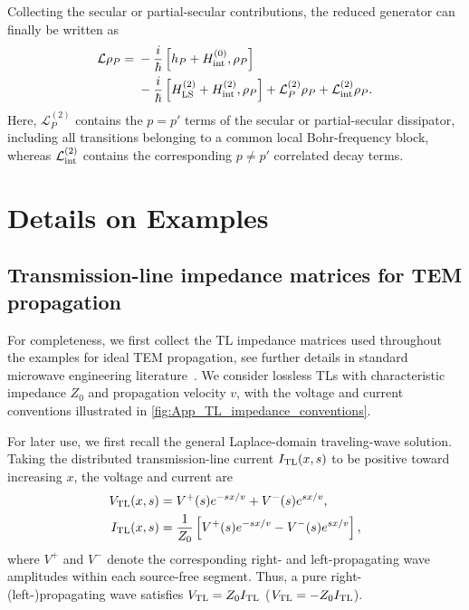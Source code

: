 \documentclass[prx,aps,twocolumn,article]{revtex4-2}
\begin{document}
Collecting the secular or partial-secular contributions, the reduced
generator can finally be written as
\begin{align}
\begin{aligned}
    \mathcal L\rho_P
    ={}&
    -\frac{i}{\hbar}
    \left[
        h_P
        +
        H_{\mathrm{int}}^{(0)},
        \rho_P
    \right]
    \\
    &-
    \frac{i}{\hbar}
    \left[
        H_{\rm LS}^{(2)}
        +
        H_{\rm int}^{(2)},
        \rho_P
    \right]
    +
    \mathcal L_P^{(2)}\rho_P
    +
    \mathcal L_{\rm int}^{(2)}\rho_P.
\end{aligned}
\label{Eq:EffectiveMEAppendix}
\end{align}
Here,
$\mathcal L_P^{(2)}$
contains the $p=p'$ terms of the secular or partial-secular dissipator,
including all transitions belonging to a common local Bohr-frequency
block, whereas
$\mathcal L_{\rm int}^{(2)}$
contains the corresponding $p\neq p'$ correlated decay terms.

\section{Details on Examples}
\label{AppSec:DetailsExamples}
\subsection{Transmission-line impedance matrices for TEM propagation}
\label{AppSec:TransmissionLineImpedances}

For completeness, we first collect the TL impedance matrices used throughout the examples for ideal TEM propagation, see further details in standard microwave engineering literature~\cite{Pozar:2009}. We consider lossless TLs with characteristic impedance $Z_0$ and propagation velocity $v$, with the voltage and current conventions illustrated in \cref{fig:App_TL_impedance_conventions}.

For later use, we first recall the general Laplace-domain traveling-wave solution. Taking the distributed transmission-line current
$I_{\rm TL}(x,s)$ to be positive toward increasing $x$, the voltage and
current are
\begin{align}
\begin{aligned}
    V_{\rm TL}(x,s)
    &=
    V^+(s)e^{-sx/v}
    +
    V^-(s)e^{sx/v},
    \\
    I_{\rm TL}(x,s)
    &=
    \frac{1}{Z_0}
    \left[
        V^+(s)e^{-sx/v}
        -
        V^-(s)e^{sx/v}
    \right],
\end{aligned}
    \label{Eq:TLTravelingWaveSolution}
\end{align}
where $V^+$ and $V^-$ denote the corresponding right- and left-propagating wave amplitudes within each source-free segment. Thus, a pure right- (left-)propagating wave satisfies $V_{\rm TL}=Z_0I_{\rm TL}$
($V_{\rm TL}=-Z_0I_{\rm TL}$).
\end{document}
